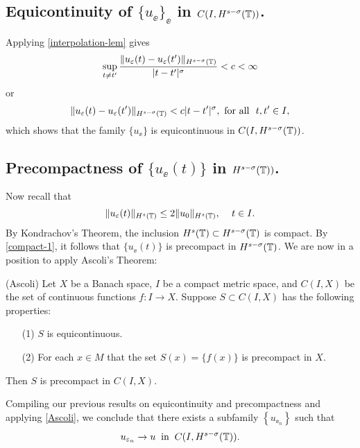 \subsection{Equicontinuity of $\{u_\ee\}_\ee$  in
$C(I,H^{s-\sigma}(\mathbb{T}))$.} Applying  \cref{interpolation-lem} gives 
%
\begin{equation}
\label{equic-1}
\sup_{t \neq t'} \frac {\|u_\varepsilon(t) - u_\varepsilon(t') \|_{H^{s -
\sigma}(\mathbb{T})}}{|t - t'|^\sigma} < c<\infty
\end{equation}
%
or
%
\begin{equation}
\label{equic-2}
\|u_\varepsilon(t) - u_\varepsilon(t') \|_{H^{s - \sigma}(\mathbb{T})}< c|t - t'|^\sigma, 
 \ \text{for all} \  \,\,  t, t'\in I,
\end{equation}
%
which shows that  the family  $\{u_\ee\}$ is equicontinuous in 
$C(I, H^{s-\sigma}(\mathbb{T}))$.
%
%
%
%
%
%
%
%
%
%
%		
\subsection{Precompactness of $\{u_\ee(t)\}$ in $H^{s-\sigma}(\mathbb{T}))$.}
Now recall that
\begin{equation}
\label{compact-1}
\|u_\varepsilon(t)\|_{H^{s}(\mathbb{T})}
\le
2 \|u_0 \|_{H^s(\mathbb{T})}, \,
\quad
t\in I.
\end{equation}
%
By Kondrachov's Theorem, the inclusion $H^s(\mathbb{T}) \subset H^{s-
\sigma }(\mathbb{T})$ is compact. By \eqref{compact-1},
it follows that $\{u_\ee(t)\}$ is precompact in $H^{s-\sigma}(\mathbb{T})$.
%
%
%
%
We are now in a position to apply Ascoli's Theorem: 
\begin{theorem}
\label{Ascoli}
(Ascoli)  Let $X$ be a Banach space, $I$ be a compact metric space,
and $C(I,X)$  be the set of continuous functions $f: I\longrightarrow X$.
Suppose $S \subset C(I,X)$  has the following properties:
%
\begin{itemize}
\item[(1)]   $S$ is  equicontinuous.
\item[(2)]  For each $x \in M$ that the set $S(x) = \{f(x)\}$  is  precompact in $X$.
\end{itemize} 
%
Then $S$  is  precompact  in  $C(I,X)$.
\end{theorem}
Compiling our previous results on equicontinuity and precompactness
and applying \cref{Ascoli}, we
conclude that there exists a subfamily $\left\{ u_{\ee_n} \right\}$
such that
\begin{equation}
\label{strong-conv-of-u_ep}
u_{\varepsilon_n} \to u \; \; \text{in} \; \; C(I, H^{s-\sigma}(\mathbb{T})).
\end{equation}
%
%
%
%
%
%
%
